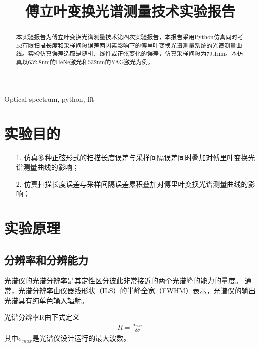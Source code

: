 \documentclass[conference]{IEEEtran}
\begin{document}
\title{傅立叶变换光谱测量技术实验报告}

\author{
}




\maketitle

\begin{abstract}
    本实验报告为傅立叶变换光谱测量技术第四次实验报告，本报告采用Python仿真同时考虑有限扫描长度和采样间隔误差两因素影响下的傅里叶变换光谱测量系统的光谱测量曲线。实验仿真误差选取是随机、线性或正弦变化的误差，仿真采样间隔为79.1nm。本仿真以632.8nm的HeNe激光和532nm的YAG激光为例。
\end{abstract}

\begin{IEEEkeywords}
    Optical spectrum, python, fft
\end{IEEEkeywords}

\section{实验目的}
\begin{itemize}
    \item[1.] 仿真多种正弦形式的扫描长度误差与采样间隔误差同时叠加对傅里叶变换光谱测量曲线的影响；
    \item[2.] 仿真扫描长度误差与采样间隔误差累积叠加对傅里叶变换光谱测量曲线的影响； 
\end{itemize} 

\section{实验原理}
\subsection{分辨率和分辨能力}
光谱仪的光谱分辨率是其定性区分彼此非常接近的两个光谱峰的能力的量度。 通常，光谱分辨率由仪器线形状（ILS）的半峰全宽（FWHM）表示，光谱仪的输出光谱具有纯单色输入辐射。

光谱分辨率R由下式定义
\begin{align}
    R = \frac{\sigma_{max}}{\delta \sigma}
\end{align}
其中$\sigma_{max}$是光谱仪设计运行的最大波数。
\end{document}

